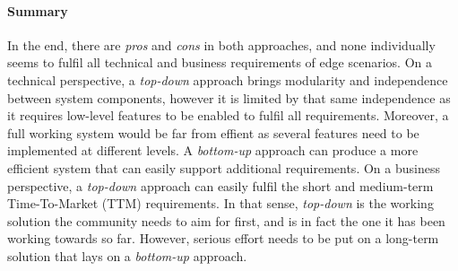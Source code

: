 
\paragraph{Summary}
In the end, there are \emph{pros} and \emph{cons} in both approaches, and none individually seems to fulfil all technical and business requirements of edge scenarios.
On a technical perspective, a \emph{top-down} approach brings modularity and independence between system components, however it is limited by that same independence as it requires low-level features to be enabled to fulfil all requirements. Moreover, a full working system would be far from effient as several features need to be implemented at different levels.
A \emph{bottom-up} approach can produce a more efficient system that can easily support additional requirements.
On a business perspective, a \emph{top-down} approach can easily fulfil the short and medium-term Time-To-Market (TTM) requirements. In that sense, \emph{top-down} is the working solution the community needs to aim for first, and is in fact the one it has been working towards so far. However, serious effort needs to be put on a long-term solution that lays on a \emph{bottom-up} approach.




